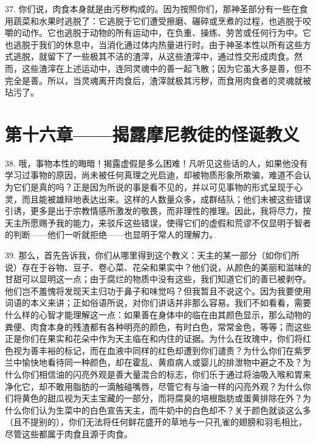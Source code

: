 37. 你们说，肉食本身就是由污秽构成的。因为按照你们，那神圣部分有一些在食用蔬菜和水果时逃脱了：它逃脱于它们遭受擦磨、碾碎或烹煮的过程，也逃脱于咬嚼的动作。它也逃脱于动物的所有运动中，在负重、操练、劳苦或任何行为中。它也逃脱于我们的休息中，当消化通过体内热量进行时。由于神圣本性以所有这些方式逃脱，就留下了一些极其不洁的渣滓，从这些渣滓中，通过性交形成肉食。然而，这些渣滓在上述运动中，连同灵魂中的善一起飞散；因为它虽大多是善，但不完全是善。所以，当灵魂离开肉食后，渣滓就极其污秽，而食用肉食者的灵魂就被玷污了。\par


\section{第十六章——揭露摩尼教徒的怪诞教义}

38. 哦，事物本性的晦暗！揭露虚假是多么困难！凡听见这些话的人，如果他没有学习过事物的原因，尚未被任何真理之光启迪，却被物质形象所欺骗，难道不会认为它们是真的吗？正是因为所说的事是看不见的，并以可见事物的形式呈现于心灵，而且能被雄辩地表达出来。这样的人数量众多，成群结队；他们未被这些错误引诱，更多是出于宗教情感所激发的敬畏，而非理性的推理。因此，我将尽力，按天主所愿赐予我的能力，来驳斥这些错误，使得它们的虚假和荒谬不仅显明于智者的判断——他们一听就拒绝——也显明于常人的理解力。\par

39. 那么，首先告诉我，你们从哪里得到这个教义：天主的某一部分（如你们所说）存在于谷物、豆子、卷心菜、花朵和果实中？他们说，从颜色的美丽和滋味的甘甜可以显明这一点；由于腐烂的物质中没有这些，我们知道它们的善已被剥夺。他们岂不羞愧将发现天主归功于鼻子和味觉吗？但我暂且不说这个。因为我要使用词语的本义来讲；正如俗语所说，对你们讲话并非那么容易。我们不如看看，需要什么样的心智才能理解这一点：如果善在身体中的临在由其颜色显示，那么动物的粪便、肉食本身的残渣都有各种明亮的颜色，有时白色，常常金色，等等；而这些正是你们在果实和花朵中作为天主临在和内住的证据。为什么在玫瑰中，你们将红色视为善丰裕的标记，而在血液中同样的红色却遭到你们谴责？为什么你们在紫罗兰中愉快地看待同一种颜色，却在霍乱、黄疸病人或婴儿的排泄物中避之不及？为什么你们相信油的闪亮外观是善大量混合的标志，你们乐于通过将油吸入喉和胃来净化它，却不敢用脂肪的一滴触碰嘴唇，尽管它有与油一样的闪亮外观？为什么你们将黄色的甜瓜视为天主宝藏的一部分，而将腐臭的培根脂肪或蛋黄排除在外？为什么你们认为生菜中的白色宣告天主，而牛奶中的白色却不？关于颜色就谈这么多（且不提别的），你们无法将任何鲜花盛开的草地与一只孔雀的翅膀和羽毛相比，尽管这些都属于肉食且源于肉食。\par

